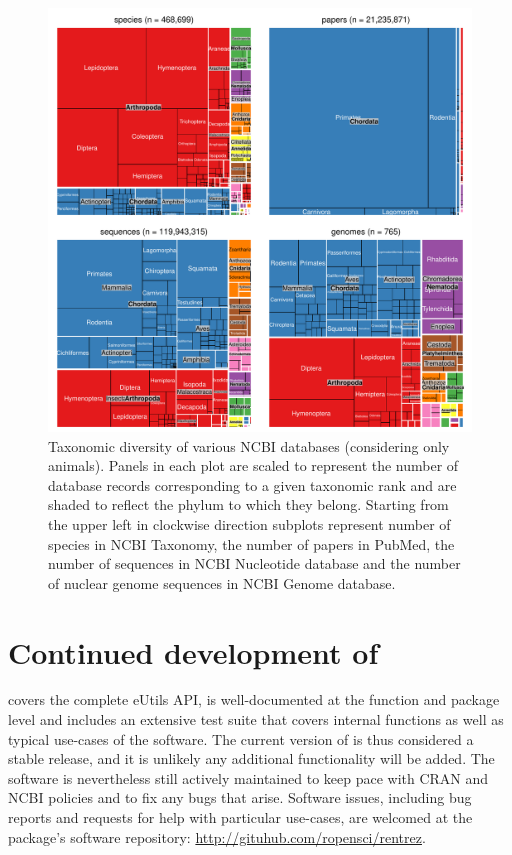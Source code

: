 \begin{figure}
\begin{center}
\includegraphics{Fig1}
\caption{Taxonomic diversity of various NCBI databases (considering only
animals). Panels in each plot are scaled to represent the number of database
records corresponding to a given taxonomic rank and are shaded to reflect the
phylum to which they belong. Starting from the upper left in clockwise direction
subplots represent number of species in NCBI Taxonomy, the number of papers 
in PubMed, the number of sequences in NCBI Nucleotide database and the number of 
nuclear genome sequences in NCBI Genome database.}
\label{fig:tm}
\end{center}
\end{figure}

\section{Continued development of }

 covers the complete eUtils API, is well-documented at the function
and package level and includes an extensive test suite that covers
internal functions as well as typical use-cases of the software. The current
version of  is thus considered a stable release, and it is
unlikely any additional functionality will be added. The software is nevertheless
still actively maintained to keep pace with CRAN and NCBI policies and to fix
any bugs that arise. Software issues, including bug reports and requests for help 
with particular use-cases, are welcomed at the package's software repository:
\url{http://gituhub.com/ropensci/rentrez}.

